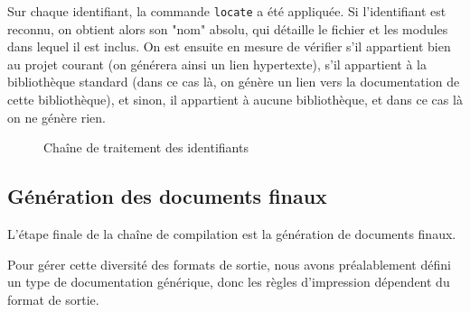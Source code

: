 \documentclass[a4paper, 11pt]{report}
\begin{document}
    Sur chaque identifiant, la commande \texttt{locate} a été appliquée. Si
    l'identifiant est reconnu, on obtient alors son "nom" absolu, qui détaille
    le fichier et les modules dans lequel il est inclus.
    On est ensuite en mesure de vérifier s'il appartient bien au projet courant
    (on générera ainsi un lien hypertexte), s'il appartient à la bibliothèque
    standard (dans ce cas là, on génère un lien vers la documentation de
    cette bibliothèque), et sinon, il appartient à aucune bibliothèque,
    et dans ce cas là on ne génère rien.
    \begin{figure}
      \caption{Chaîne de traitement des identifiants\label{id1}}
    \end{figure}
    \clearpage

    \subsection{Génération des documents finaux}
    L'étape finale de la chaîne de compilation est la génération de documents
    finaux.

    Pour gérer cette diversité des formats de sortie, nous avons préalablement
    défini un type de documentation générique, donc les règles d'impression
    dépendent du format de sortie.
\end{document}
